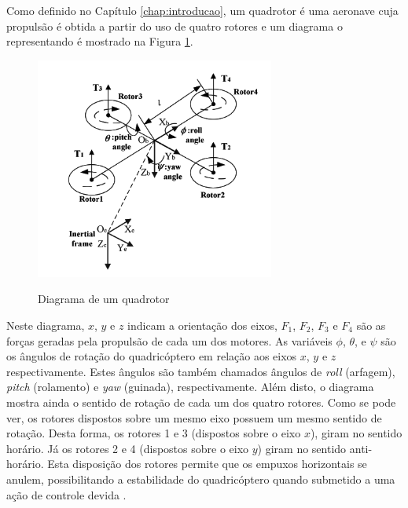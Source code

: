 Como definido no Capítulo \ref{chap:introducao}, um quadrotor é uma aeronave cuja propulsão é obtida a partir do uso de quatro rotores e um diagrama o representando é mostrado na Figura \ref{fig:drone_diagram}. 


\begin{figure}[!htb]
    \centering
    \caption{Diagrama de um quadrotor}
    \includegraphics[width=0.7\textwidth]{./04-figuras/drone_diagram/drone_test_sep-1}
    \label{fig:drone_diagram}
\end{figure}

Neste diagrama, $x$, $y$ e $z$ indicam a orientação dos eixos, $F_1$, $F_2$, $F_3$ e $F_4$ são as forças geradas pela propulsão de cada um dos motores. As variáveis $\phi$, $\theta$, e $\psi$ são os ângulos de rotação do quadricóptero em relação aos eixos $x$, $y$ e $z$ respectivamente. Estes ângulos são também chamados ângulos de \textit{roll} (arfagem), \textit{pitch} (rolamento) e \textit{yaw} (guinada), respectivamente. Além disto, o diagrama mostra ainda o sentido de rotação de cada um dos quatro rotores. Como se pode ver, os rotores dispostos sobre um mesmo eixo possuem um mesmo sentido de rotação. Desta forma, os rotores 1 e 3 (dispostos sobre o eixo $x$), giram no sentido horário. Já os rotores 2 e 4 (dispostos sobre o eixo $y$) giram no sentido anti-horário. Esta disposição dos rotores permite que os empuxos horizontais se anulem, possibilitando a estabilidade do quadricóptero quando submetido a uma ação de controle devida \cite[p.~1]{Ariffanan2014}.

